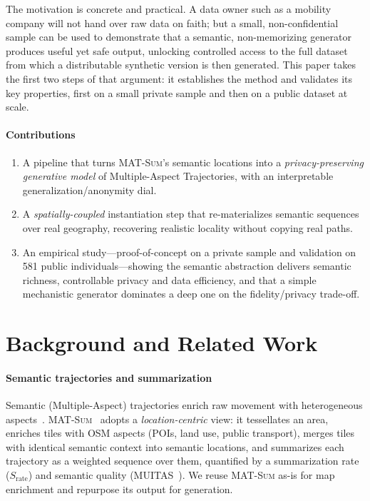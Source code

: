 \documentclass[sigconf,nonacm]{acmart}
\begin{document}
The motivation is concrete and practical. A data owner such as a mobility company will not hand over
raw data on faith; but a small, non-confidential sample can be used to demonstrate that a semantic,
non-memorizing generator produces useful yet safe output, unlocking controlled access to the full
dataset from which a distributable synthetic version is then generated. This paper takes the first two
steps of that argument: it establishes the method and validates its key properties, first on a small
private sample and then on a public dataset at scale.

\paragraph{Contributions}
\begin{enumerate}
  \item A pipeline that turns \textsc{MAT-Sum}'s semantic locations into a \emph{privacy-preserving
  generative model} of Multiple-Aspect Trajectories, with an interpretable generalization/anonymity
  dial.
  \item A \emph{spatially-coupled} instantiation step that re-materializes semantic sequences over
  real geography, recovering realistic locality without copying real paths.
  \item An empirical study---proof-of-concept on a private sample and validation on 581 public
  individuals---showing the semantic abstraction delivers semantic richness, controllable privacy and
  data efficiency, and that a simple mechanistic generator dominates a deep one on the fidelity/privacy
  trade-off.
\end{enumerate}

\section{Background and Related Work}
\paragraph{Semantic trajectories and summarization}
Semantic (Multiple-Aspect) trajectories enrich raw movement with heterogeneous
aspects~\cite{spaccapietra2008,bogorny2019}. \textsc{MAT-Sum}~\cite{pugliese2023} adopts a
\emph{location-centric} view: it tessellates an area, enriches tiles with OSM aspects (POIs, land use,
public transport), merges tiles with identical semantic context into semantic locations, and
summarizes each trajectory as a weighted sequence over them, quantified by a summarization rate
($S_{\text{rate}}$) and semantic quality (MUITAS~\cite{petry2019}). We reuse \textsc{MAT-Sum} as-is
for map enrichment and repurpose its output for generation.
\end{document}
